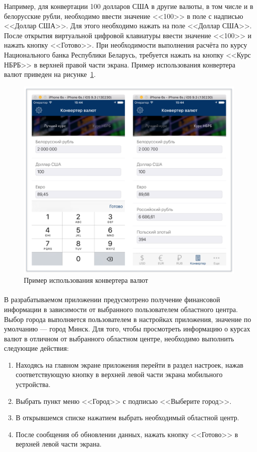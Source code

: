 Например, для конвертации 100 долларов США в другие валюты, в том числе
и в белорусские рубли, необходимо ввести значение <<100>> в поле с
надписью <<Доллар США>>. Для этого необходимо нажать на поле <<Доллар США>>.
После открытия виртуальной цифровой клавиатуры ввести значение <<100>>
и нажать кнопку <<Готово>>. При необходимости выполнения расчёта по курсу
Национального банка Республики Беларусь, требуется нажать на кнопку <<Курс НБРБ>>
в верхней правой части экрана. Пример использования конвертера валют приведен на
рисунке~\ref{fig:converter_manual}.
\begin{figure}[h!]
  \centering
  \includegraphics[width=150mm]{fig/converter_manual}
  \caption{Пример использования конвертера валют}
  \label{fig:converter_manual}
\end{figure}



\paragraph{}

В разрабатываемом приложении предусмотрено получение финансовой информации в
зависимости от выбранного пользователем областного центра. Выбор города
выполняется пользователем в настройках приложения, значение по умолчанию ---
город Минск. Для того, чтобы просмотреть информацию о курсах валют в отличном
от выбранного областном центре, необходимо выполнить следующие действия:
\begin{enumerate}
  \item Находясь на главном экране приложения перейти в раздел настроек, нажав
    соответствующую кнопку в верхней левой части экрана мобильного устройства.
  \item Выбрать пункт меню <<Город>> с подписью <<Выберите город>>.
  \item В открывшемся списке нажатием выбрать необходимый областной центр.
  \item После сообщения об обновлении данных, нажать кнопку <<Готово>>
    в верхней левой части экрана.
\end{enumerate}

